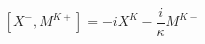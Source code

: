 \begin{equation}\label{14a}
\left[X^{-},M^{K+}\right]=-i X^{K} -\frac{i}{\kappa}M^{K-}
\end{equation}

